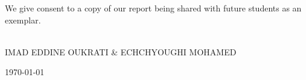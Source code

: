 \documentclass[a4paper,11pt,oneside]{book}
\begin{document}
    \noindent
    We give consent to a copy of our report being shared with future students as an exemplar. \\
    
    ~\\[1cm]
    \begin{flushright}
    IMAD EDDINE OUKRATI \& ECHCHYOUGHI MOHAMED
    
    \today
    \end{flushright}

     
    
    
   
       
    
    
    \tableofcontents
    \listoffigures
    \listoftables



    
    
    \mainmatter
    
    
    
    
    
    
    
    
    

   


    
    
    
    
    \begin{appendices}
        
    \end{appendices}
    
\end{document}
